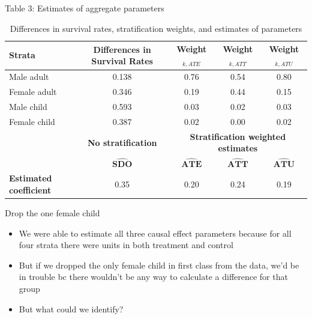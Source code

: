 \documentclass{beamer}
\begin{document}
\begin{frame}{Table 3: Estimates of aggregate parameters}

{\renewcommand{\arraystretch}{1.1}
\tabcolsep 		
\begin{table}\tiny{}
\caption{Differences in survival rates, stratification weights, and estimates of parameters}
\centering
\begin{tabular}{lc|ccc}
\toprule
\multicolumn{1}{l}{\textbf{Strata}}&
\multicolumn{1}{c}{\textbf{Differences in Survival Rates}}&
\multicolumn{1}{c}{\textbf{Weight$_{k,ATE}$}}&
\multicolumn{1}{c}{\textbf{Weight$_{k,ATT}$}}&
\multicolumn{1}{c}{\textbf{Weight$_{k,ATU}$}}\\
\midrule
Male adult		& 0.138 &	0.76 &	0.54	&0.80	\\
Female adult	& 0.346 &	0.19 &	0.44	&0.15	\\
Male child		& 0.593 &	0.03 &	0.02	&0.03	\\
Female child	& 0.387 &	0.02 &	0.00	&0.02	\\
\midrule
\multicolumn{1}{l}{\textbf{}}&
\multicolumn{1}{c}{\textbf{No stratification}}&
\multicolumn{3}{c}{\textbf{Stratification weighted estimates}}\\

 & $\widehat{\textbf{SDO}}$& $\widehat{\textbf{ATE}}$ & $\widehat{\textbf{ATT}}$ & $\widehat{\textbf{ATU}}$ \\
\midrule
\textbf{Estimated coefficient}& 0.35 & 0.20 & 	0.24	 & 0.19   \\
\bottomrule
\end{tabular}
\label{tab:titanic-weights}
\end{table}}



\end{frame}



\begin{frame}{Drop the one female child}

\begin{itemize}
\item We were able to estimate all three causal effect parameters because for all four strata there were units in both treatment and control
\item But if we dropped the only female child in first class from the data, we'd be in trouble bc there wouldn't be any way to calculate a difference for that group
\item But what could we identify?

\end{itemize}

\end{frame}
\end{document}
